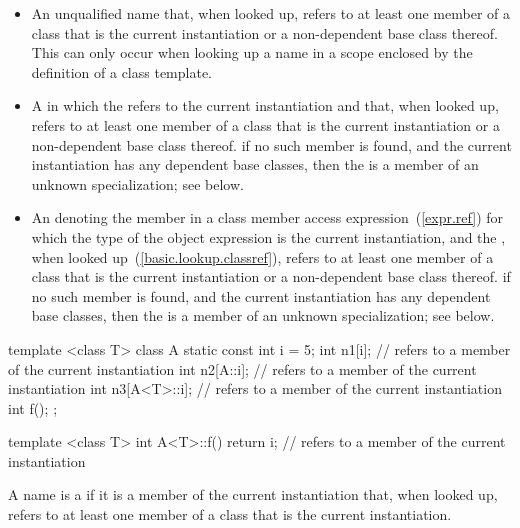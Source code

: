 \begin{itemize}
\item
An unqualified name that, when looked up, refers to
at least one member of a class that is
the current instantiation or a non-dependent base class thereof.
\enternote
This can only occur when looking up a name in a scope enclosed by the
definition of a class template.
\exitnote
\item
A
in which the
refers to the current instantiation
and that, when looked up, refers to at least one member of a class that is
the current
instantiation or a non-dependent base class thereof. \enternote if no such
member is found, and the current instantiation has any dependent base classes,
then the  is a member of an unknown specialization;
see below. \exitnote

\item
An  denoting the member in a class member access
expression~(\ref{expr.ref}) for which the type of the object expression is the
current instantiation, and the , when looked
up~(\ref{basic.lookup.classref}), refers to at least one member of a class
that is the current
instantiation or a non-dependent base class thereof. \enternote if no such
member is found, and the current instantiation has any dependent base classes,
then the  is a member of an unknown specialization;
see below. \exitnote
\end{itemize}

\enterexample
\begin{codeblock}
template <class T> class A {
  static const int i = 5;
  int n1[i];        //  refers to a member of the current instantiation
  int n2[A::i];     //  refers to a member of the current instantiation
  int n3[A<T>::i];  //  refers to a member of the current instantiation
  int f();
};

template <class T> int A<T>::f() {
  return i;         //  refers to a member of the current instantiation
}
\end{codeblock}
\exitexample

%
A name is a  if it is a
member of the current instantiation that, when looked up, refers to at least
one member of a class that is the current instantiation.

